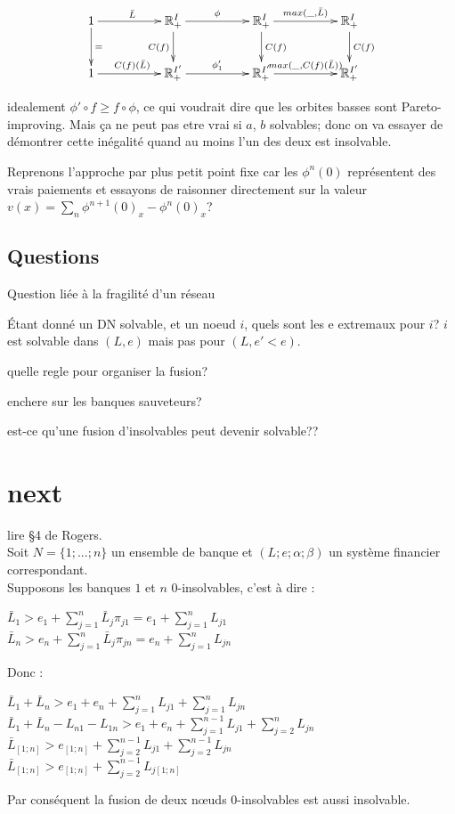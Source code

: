 \documentclass{article}
\def\AR#1{
\[
\begin{array}{llllllll}
#1
\end{array}
\]
}
\begin{document}
\AR{
\xymatrix@C=50pt{
1
\ar[r]^{\bar L}
\ar[d]^{=}
&
\mathbb R_+^I 
\ar[r]^{\phi}
\ar[d]_{C(f)}
&
\mathbb R_+^I
\ar[r]^{max(\_,\bar  L)}
\ar[d]^{C(f)}
&
\mathbb R_+^I
\ar[d]^{C(f)}
\\
1
\ar[r]^{C(f)(\bar  L)}
&
\mathbb R_+^{I'} 
\ar[r]^{\phi'_1}
&
\mathbb R_+^{I'}
\ar[r]^{max(\_,C(f)(\bar  L))}
&
\mathbb R_+^{I'}
}
}

idealement $\phi'\circ f \geq f\circ\phi$, ce qui voudrait dire que
les orbites basses sont Pareto-improving. Mais ça ne peut pas etre vrai si $a$, $b$ solvables; donc on va essayer de démontrer cette inégalité quand au moins l'un des deux est insolvable.

Reprenons l'approche par plus petit point fixe car les $\phi^n(0)$ 
représentent des vrais paiements et essayons de raisonner directement
sur la valeur $v(x) = \sum_n \phi^{n+1}(0)_x-\phi^n(0)_x$?


\subsection{Questions}

Question liée à la fragilité d'un réseau

Étant donné un DN solvable, et un noeud $i$,
quels sont les e extremaux pour $i$?
$i$ est solvable dans $(L,e)$ mais pas
pour $(L,e'<e)$.

quelle regle pour organiser la fusion?

enchere sur les banques sauveteurs?

est-ce qu'une fusion d'insolvables 
peut devenir solvable??

\section{next}

lire \S4 de Rogers.\\

Soit $N = \lbrace 1;...; n\rbrace$ un ensemble de banque et $(L; e; \alpha; \beta)$ un système financier correspondant.\\
Supposons les banques $1$ et $n$ $0$-insolvables, c'est à dire :
\begin{center}
$\bar{L}_{1} > e_{1} + \sum_{j=1}^{n} \bar{L}_{j} \pi_{j1} = e_{1} + \sum_{j=1}^{n} L_{j1}$\\
$\bar{L}_{n} > e_{n} + \sum_{j=1}^{n} \bar{L}_{j} \pi_{jn} = e_{n} + \sum_{j=1}^{n} L_{jn}$
\end{center}
Donc :
\begin{center}
 $\bar{L}_{1} + \bar{L}_{n} > e_{1} + e_{n} + \sum_{j=1}^{n} L_{j1} + \sum_{j=1}^{n} L_{jn}$\\
$\bar{L}_{1} + \bar{L}_{n} - L_{n1} - L_{1n} > e_{1} + e_{n} + \sum_{j=1}^{n-1} L_{j1} + \sum_{j=2}^{n} L_{jn}$\\
$\bar{L}_{\left[ 1;n\right]} > e_{\left[ 1;n\right]} + \sum_{j=2}^{n-1} L_{j1} + \sum_{j=2}^{n-1} L_{jn}$ \\
$\bar{L}_{\left[ 1;n\right]} > e_{\left[ 1;n\right]} + \sum_{j=2}^{n-1} L_{j\left[ 1;n\right]}$
\end{center}
Par conséquent la fusion de deux nœuds $0$-insolvables est aussi insolvable.
\end{document}
